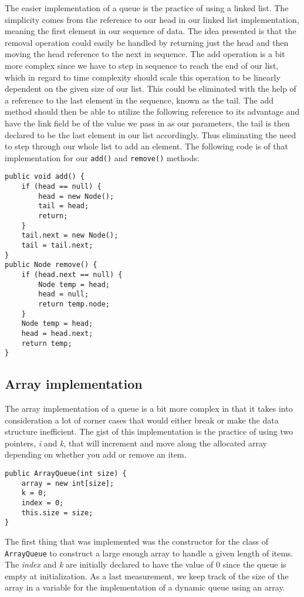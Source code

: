 \documentclass[a4paper,11pt]{article}
\begin{document}
        The easier implementation of a queue is the practice of using a linked list. The simplicity comes from the reference to our head in our linked list implementation, meaning the first element in our sequence of data. The idea presented is that the removal operation could easily be handled by returning just the head and then moving the head reference to the next in sequence. The add operation is a bit more complex since we have to step in sequence to reach the end of our list, which in regard to time complexity should scale this operation to be linearly dependent on the given size of our list. This could be eliminated with the help of a reference to the last element in the sequence, known as the tail. The add method should then be able to utilize the following reference to its advantage and have the link field be of the value we pass in as our parameters, the tail is then declared to be the last element in our list accordingly. Thus eliminating the need to step through our whole list to add an element. The following code is of that implementation for our \texttt{add()} and \texttt{remove()} methods:
        \begin{verbatim}
public void add() {
    if (head == null) {
        head = new Node();
        tail = head;
        return;
    }
    tail.next = new Node();
    tail = tail.next;
}
public Node remove() {
    if (head.next == null) {
        Node temp = head;
        head = null;
        return temp.node;
    }
    Node temp = head;
    head = head.next;
    return temp;
}
    \end{verbatim}
        
    \subsection*{Array implementation}

        The array implementation of a queue is a bit more complex in that it takes into consideration a lot of corner cases that would either break or make the data structure inefficient. The gist of this implementation is the practice of using two pointers, \textit{i} and \textit{k}, that will increment and move along the allocated array depending on whether you add or remove an item.
        \begin{verbatim}
public ArrayQueue(int size) {
    array = new int[size];
    k = 0;
    index = 0;
    this.size = size;
}
        \end{verbatim}
        The first thing that was implemented was the constructor for the class of \texttt{ArrayQueue} to construct a large enough array to handle a given length of items. The \textit{index} and \textit{k} are initially declared to have the value of 0 since the queue is empty at initialization. As a last measurement, we keep track of the size of the array in a variable for the implementation of a dynamic queue using an array. 
\end{document}
